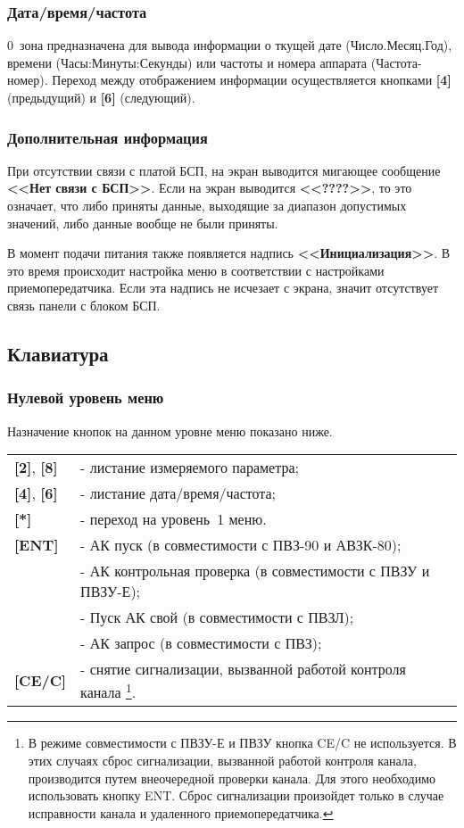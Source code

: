\subsubsection{Дата/время/частота}

0~зона предназначена для вывода информации о ткущей дате (Число.Месяц.Год), времени (Часы:Минуты:Секунды) или частоты и номера аппарата (Частота-номер). Переход между отображением информации осуществляется кнопками \textbf{[4]} (предыдущий) и \textbf{[6]} (следующий).


\subsubsection{Дополнительная информация}

При отсутствии связи с платой БСП, на экран выводится мигающее сообщение \textbf{<<Нет связи с БСП>>}. Если на экран выводится \textbf{<<????>>}, то это означает, что либо приняты данные, выходящие за диапазон допустимых значений, либо данные вообще не были приняты.

В момент подачи питания также появляется надпись \textbf{<<Инициализация>>}. В это время происходит настройка меню в соответствии с настройками приемопередатчика. Если эта надпись не исчезает с экрана, значит отсутствует связь панели с блоком БСП.
 
 
\subsection{Клавиатура} \label{ssec:keyboard}


\subsubsection{Нулевой уровень меню}

Назначение кнопок на данном уровне меню показано ниже.

\begin{center}
	\begin{longtable}{p{2cm} p{15cm}}
	    \textbf{[2]}, \textbf{[8]} & - листание измеряемого параметра; 		\tabularnewline
	    \textbf{[4]}, \textbf{[6]} & - листание дата/время/частота; 		\tabularnewline
	    \textbf{[*]} & - переход на уровень~1 меню.		 					\tabularnewline
	    \textbf{[ENT]} 	& - АК пуск (в совместимости с ПВЗ-90 и АВЗК-80);	\tabularnewline
	    				& - АК контрольная проверка (в совместимости с ПВЗУ и ПВЗУ-Е);	\tabularnewline
	    				& - Пуск АК свой (в совместимости с ПВЗЛ);			\tabularnewline
	    				& - АК запрос (в совместимости с ПВЗ);				\tabularnewline 
		\textbf{[CE/C]} & - снятие сигнализации, вызванной работой контроля канала
							\footnote{В режиме совместимости с ПВЗУ-Е и ПВЗУ кнопка CE/C не используется. В этих случаях сброс сигнализации, вызванной работой контроля канала, производится путем внеочередной проверки канала. Для этого необходимо использовать кнопку ENT. Сброс сигнализации произойдет только в случае исправности канала и удаленного приемопередатчика.}.  				        \tabularnewline		
	\end{longtable}
\end{center}


